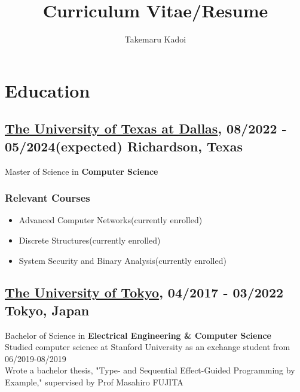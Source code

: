 \documentclass[10pt]{article}
\title{\vspace{-1cm}Curriculum Vitae/Resume}
\author{Takemaru Kadoi}
\date{}
\begin{document}
\section*{Education}
  \subsection*{\underline{The University of Texas at Dallas}, 08/2022 - 05/2024(expected) \hfill Richardson, Texas}
    Master of Science in \textbf{Computer Science}
    \subsubsection*{Relevant Courses}
    \begin{multicols}{2}
      \begin{itemize}[noitemsep]
        \item Advanced Computer Networks(currently enrolled)
        \item Discrete Structures(currently enrolled)
        \item System Security and Binary Analysis(currently enrolled)
      \end{itemize}
    \end{multicols}

  \subsection*{\underline{The University of Tokyo}, 04/2017 -  03/2022 \hfill Tokyo, Japan}
    Bachelor of Science in \textbf{Electrical Engineering \& Computer Science}
    \\
    Studied computer science at Stanford University as an exchange student from 06/2019-08/2019
    \\
    Wrote a bachelor thesis, "Type- and Sequential Effect-Guided Programming by Example," supervised by Prof Masahiro FUJITA
\end{document}
